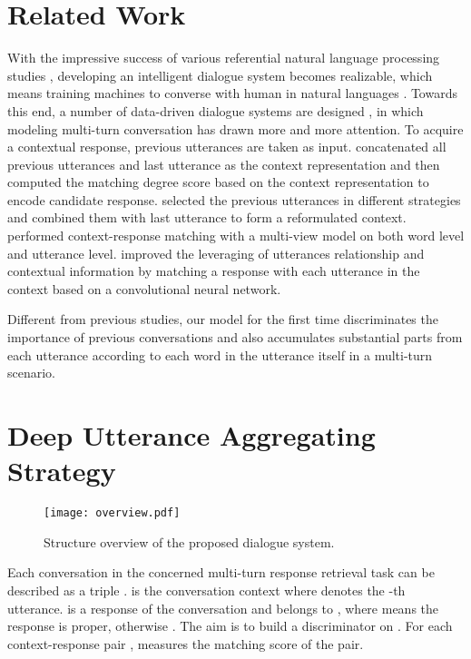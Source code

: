\documentclass[11pt]{article}
\begin{document}
\section{Related Work}
With the impressive success of various referential  natural  language
processing studies \cite{Zhang2016Probabilistic,Cai2017Pair,zhang2018NHD,Qin2017Adversarial,zhang2018SubMRC,Bai2018deep}, developing an intelligent dialogue system becomes realizable, which means training machines to converse with human in natural languages \cite{williams-asadi-zweig,he-EtAl,dhingra-EtAl,Zhang2018Personalizing}. Towards this end, a number of data-driven dialogue systems are designed \cite{Lowe2015The,Wu2016Sequential,wenN2N17,hongyuan17,Young2017Augmenting,Lipton2016BBQ}, in which modeling multi-turn conversation has drawn more and more attention. To acquire a contextual response, previous utterances are taken as input.  concatenated  all previous utterances and last utterance as the context representation and then computed the matching degree score based on the context representation to encode candidate response.  selected the previous utterances in different strategies and combined them with last utterance to form a reformulated context.  performed context-response matching with a multi-view model on both word level and utterance level.  improved the leveraging of utterances relationship and contextual information by matching a response with each utterance in the context based on a convolutional neural network.

Different from previous studies, our model for the first time discriminates the importance of previous conversations and also accumulates substantial parts from each utterance according to each word in the utterance itself in a multi-turn scenario.

\section{Deep Utterance Aggregating Strategy}
\begin{figure*}
	\centering
	\texttt{[image: overview.pdf]}
	\caption{Structure overview of the proposed dialogue system.}
	\label{fig:overview}
\end{figure*}
Each conversation in the concerned multi-turn response retrieval task can be described as a triple .  is the conversation context where  denotes the -th utterance.  is a response of the conversation and  belongs to , where  means the response is proper, otherwise . The aim is to build a discriminator  on . For each context-response pair ,  measures the matching score of the pair.
\end{document}

